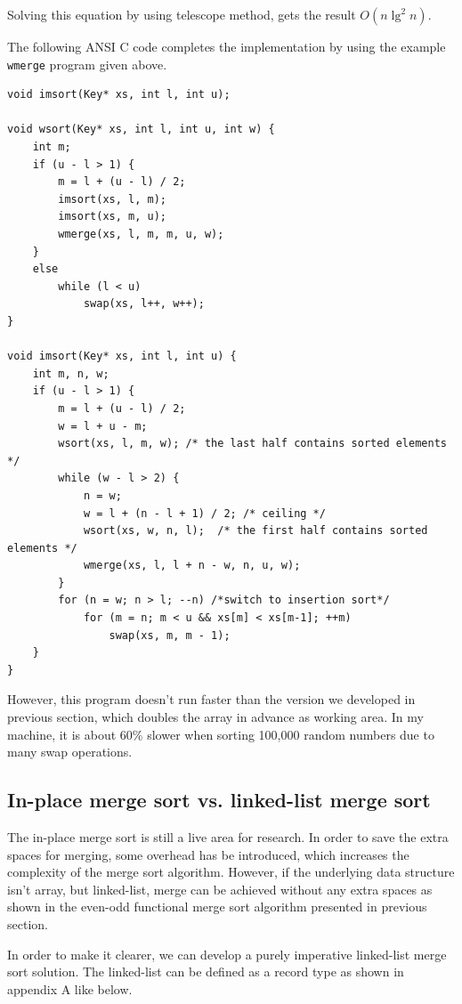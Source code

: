 \documentclass[b5paper]{article}
\begin{document}
Solving this equation by using telescope method, gets the result $O(n \lg^2 n)$.

The following ANSI C code completes the implementation by using the example \texttt{wmerge} program given
above.

\lstset{language=C}
\begin{lstlisting}
void imsort(Key* xs, int l, int u);

void wsort(Key* xs, int l, int u, int w) {
    int m;
    if (u - l > 1) {
        m = l + (u - l) / 2;
        imsort(xs, l, m);
        imsort(xs, m, u);
        wmerge(xs, l, m, m, u, w);
    }
    else
        while (l < u)
            swap(xs, l++, w++);
}

void imsort(Key* xs, int l, int u) {
    int m, n, w;
    if (u - l > 1) {
        m = l + (u - l) / 2;
        w = l + u - m;
        wsort(xs, l, m, w); /* the last half contains sorted elements */
        while (w - l > 2) {
            n = w;
            w = l + (n - l + 1) / 2; /* ceiling */
            wsort(xs, w, n, l);  /* the first half contains sorted elements */
            wmerge(xs, l, l + n - w, n, u, w);
        }
        for (n = w; n > l; --n) /*switch to insertion sort*/
            for (m = n; m < u && xs[m] < xs[m-1]; ++m)
                swap(xs, m, m - 1);
    }
}
\end{lstlisting}

However, this program doesn't run faster than the version we developed in previous section, which doubles
the array in advance as working area. In my machine, it is about 60\% slower when sorting 100,000 random
numbers due to many swap operations.

\subsection{In-place merge sort vs. linked-list merge sort}
The in-place merge sort is still a live area for research. In order to save the extra spaces for merging,
some overhead has be introduced, which increases the complexity of the merge sort algorithm. However, if
the underlying data structure isn't array, but linked-list, merge can be achieved without any extra spaces
as shown in the even-odd functional merge sort algorithm presented in previous section.

In order to make it clearer, we can develop a purely imperative linked-list merge sort solution.
The linked-list can be defined as a record type as shown in appendix A like below.
\end{document}
